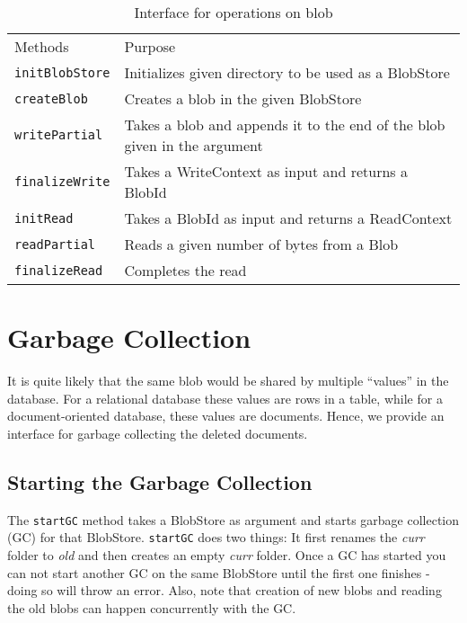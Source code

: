\begin{table}[hbt]
\caption{Interface for operations on blob}
\label{tab:interface-blob}
\begin{center}
  \begin{tabularx}{0.91\textwidth}{lX}
    \hline\noalign{\smallskip}
    Methods & Purpose \\
    \noalign{\smallskip}
    \hline
    \noalign{\smallskip}
    \texttt{initBlobStore} & Initializes given directory to be used as a BlobStore \\
    \texttt{createBlob} & Creates a blob in the given BlobStore\\
    \texttt{writePartial} & Takes a blob and appends it to the end of the blob given in the argument\\
    \texttt{finalizeWrite} & Takes a WriteContext as input and returns a BlobId \\
    \texttt{initRead} & Takes a BlobId as input and returns a ReadContext \\
    \texttt{readPartial} & Reads a given number of bytes from a Blob \\
    \texttt{finalizeRead} & Completes the read \\
    \hline
  \end{tabularx}
\end{center}
\end{table}

\section{Garbage Collection}
It is quite likely that the same blob would be shared by multiple ``values'' in the database. For a relational database these values are rows in a table, while for a document-oriented database, these values are documents.
Hence, we provide an interface for garbage collecting the deleted documents.

\subsection{Starting the Garbage Collection}
The \texttt{startGC} method takes a BlobStore as argument and starts garbage collection (GC) for that BlobStore.
\texttt{startGC} does two things: It first renames the \textit{curr} folder to \textit{old} and then creates an empty \textit{curr} folder.
Once a GC has started you can not start another GC on the same BlobStore until the first one finishes - doing so will throw an error. Also, note that creation of new blobs and reading the old blobs can happen concurrently with the GC.

